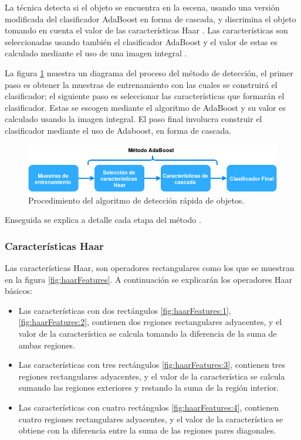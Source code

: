 La técnica detecta si el objeto se encuentra en la escena, usando una versión modificada del clasificador AdaBoost \citep{Freund1995} en forma de cascada, y discrimina el objeto tomando en cuenta el valor de las características Haar \citep{Viola2001}. Las características son seleccionadas usando también el clasificador AdaBoost y el valor de estas es calculado mediante el uso de una imagen integral \citep{Viola2001}. 

La figura \ref{fig:ViolaJonesDiagram} muestra un diagrama del proceso del método de detección, el primer paso es obtener la muestras de entrenamiento con las cuales se construirá el clasificador; el siguiente paso es seleccionar las características que formarán el clasificador. Estas se escogen mediante el algoritmo de AdaBoost y su valor es calculado usando la imagen integral. El paso final  involucra construir el clasificador mediante el uso de Adaboost,  en forma de cascada.

\begin{figure}[h!]
\begin{center}
\includegraphics[scale=.6]{./Figures/ViolaJonesDiagram.png}
\end{center}
\caption{Procedimiento del algoritmo de detección rápida de objetos.}
\label{fig:ViolaJonesDiagram}
\end{figure}

Enseguida se explica a detalle cada etapa del método \citep{Viola2001}. 

\subsubsection{Características Haar}\label{sssec:CaracteristicasHaar}  

Las características Haar, son operadores rectangulares como los que se muestran en la figura \ref{fig:haarFeatures}. A continuación se explicarán los operadores Haar básicos:
\begin{itemize}
\item Las características con dos rectángulos \ref{fig:haarFeatures:1}, \ref{fig:haarFeatures:2}, contienen dos regiones rectangulares adyacentes, y el valor de la característica se calcula tomando la diferencia de la suma de ambas regiones. 

\item Las características con tres rectángulos \ref{fig:haarFeatures:3}, contienen tres regiones rectangulares adyacentes, y el valor de la característica se calcula sumando las regiones exteriores y restando la suma de la región interior.

\item Las características con cuatro rectángulos \ref{fig:haarFeatures:4}, contienen cuatro regiones rectangulares adyacentes, y el valor de la característica se obtiene con la diferencia entre la suma de las regiones pares diagonales.
\end{itemize} 

